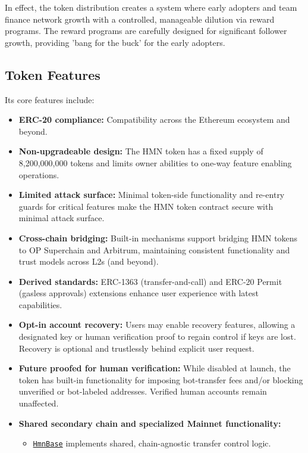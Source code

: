 \documentclass[12pt,a4paper]{article}
\begin{document}
In effect, the token distribution creates a system where early adopters and team finance network growth with a controlled, manageable dilution via reward programs.
The reward programs are carefully designed for significant follower growth, providing 'bang for the buck' for the early adopters.

\subsection{Token Features}
Its core features include:

\begin{itemize}
    \item \textbf{ERC-20 compliance:} Compatibility across the Ethereum ecosystem and beyond.
    \item \textbf{Non-upgradeable design:} The HMN token has a fixed supply of 8,200,000,000 tokens and limits owner abilities to one-way feature enabling operations.
    \item \textbf{Limited attack surface:} Minimal token-side functionality and re-entry guards for critical features make the HMN token contract secure with minimal attack surface.
    \item \textbf{Cross-chain bridging:} Built-in mechanisms support bridging HMN tokens to OP Superchain and Arbitrum, maintaining consistent functionality and trust models across L2s (and beyond).
    \item \textbf{Derived standards:} ERC-1363 (transfer-and-call) and ERC-20 Permit (gasless approvals) extensions enhance user experience with latest capabilities.
    \item \textbf{Opt-in account recovery:} Users may enable recovery features, allowing a designated key or human verification proof to regain control if keys are lost. Recovery is optional and trustlessly behind explicit user request.
    \item \textbf{Future proofed for human verification:} While disabled at launch, the token has built-in functionality for imposing bot-transfer fees and/or blocking unverified or bot-labeled addresses. Verified human accounts remain unaffected.
    \item \textbf{Shared secondary chain and specialized Mainnet functionality:} 
          \begin{itemize}
              \item \texttt{\href{https://github.com/hmn-is/hmn-contracts/blob/main/src/HmnBase.sol}{HmnBase}} implements shared, chain-agnostic transfer control logic.

\end{itemize}
\end{itemize}
\end{document}
